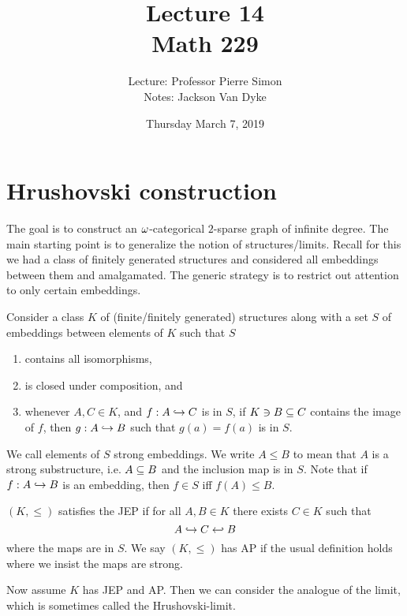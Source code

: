 \documentclass{amsart}
\begin{document}
\title{Lecture 14\\Math 229}
\date{Thursday March 7, 2019}
\author{Lecture: Professor Pierre Simon\\Notes: Jackson Van Dyke}
\maketitle

\appendix

\section{Hrushovski construction}

The goal is to construct an $\omega$-categorical $2$-sparse graph of infinite degree. The
main starting point is to generalize the notion of \Fraisse structures/limits.
Recall for this we had a class
of finitely generated structures and considered all embeddings between them and
amalgamated. The generic strategy is to restrict out attention to only certain embeddings.

Consider a class $K$ of (finite/finitely generated) structures along with a set $S$ of
embeddings between elements of $K$ such that $S$
\begin{enumerate}
\item contains all isomorphisms, 
\item is closed under composition, and
\item whenever $A, C\in K$, and $f: A\hookrightarrow C$ is in $S$, if $K\ni B\subseteq C$ contains the image
of $f$, then $g:A\hookrightarrow B$ such that $g\left( a \right) = f\left( a \right)$ is in $S$.
\end{enumerate}
We call elements of $S$ strong embeddings. 
We write $A\leq B$ to mean that $A$ is a strong substructure, i.e. $A\subseteq B$ and the
inclusion map is in $S$. Note that if $f : A\hookrightarrow B$ is an embedding, then $f\in S$ iff $f\left( A
\right)\leq B$.

\begin{defn}
$\left( K , \leq \right)$ satisfies the JEP if for all $A,B\in K$ there exists $C\in K$
such that 
\begin{equation}
A\hookrightarrow C \hookleftarrow B 
\end{equation}
where the maps are in $S$. 
We say $\left( K , \leq \right)$ has AP if the usual definition holds where we insist the
maps are strong.
\end{defn}

Now assume $K$ has JEP and AP. Then we can consider the analogue of the \Fraisse limit,
which is sometimes called the Hrushovski-\Fraisse limit. 
\end{document}
